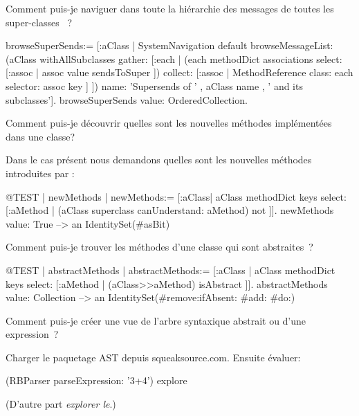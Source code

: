 \documentclass[a4paper,10pt,twoside]{book}
\begin{document}
\begin{faq}
Comment puis-je naviguer dans toute la hi\'erarchie des messages de toutes les super-classes  ~?
\end{faq}
\answer
\begin{code}{}
browseSuperSends:= [:aClass | SystemNavigation default
	browseMessageList: (aClass withAllSubclasses gather: [:each |
		(each methodDict associations
			select: [:assoc | assoc value sendsToSuper ])
				collect: [:assoc | MethodReference class: each selector: assoc key ] ])
	name: 'Supersends of ' , aClass name , ' and its subclasses'].
browseSuperSends value: OrderedCollection.
\end{code}

\begin{faq}
Comment puis-je d\'ecouvrir quelles sont les nouvelles m\'ethodes impl\'ement\'ees dans une classe?
\end{faq}
\answer
Dans le cas pr\'esent nous demandons quelles sont les nouvelles m\'ethodes introduites par :
\begin{code}{@TEST | newMethods |}
newMethods:= [:aClass| aClass methodDict keys select:
	[:aMethod | (aClass superclass canUnderstand: aMethod) not ]].
newMethods value: True --> an IdentitySet(#asBit)
\end{code}

\begin{faq}
Comment puis-je 
trouver
les m\'ethodes d'une classe qui sont abstraites~?
\end{faq}
\answer
\begin{code}{@TEST | abstractMethods |}
abstractMethods:=
	[:aClass | aClass methodDict keys select:
		[:aMethod | (aClass>>aMethod) isAbstract ]].
abstractMethods value: Collection --> an IdentitySet(#remove:ifAbsent: #add: #do:)
\end{code}

\begin{faq}
Comment puis-je cr\'eer une vue de 
l'arbre syntaxique abstrait ou 
 d'une expression~?
\end{faq}
\answer
Charger le paquetage AST depuis squeaksource.com. Ensuite \'evaluer:
\begin{code}{}
(RBParser parseExpression: '3+4') explore
\end{code}
(D'autre part \emph{explorer le}.)
\end{document}
